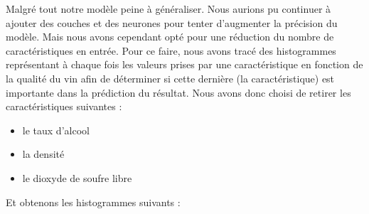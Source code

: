 \vspace{1cm}

Malgré tout notre modèle peine à généraliser. Nous aurions pu continuer à ajouter des couches et des neurones
pour tenter d'augmenter la précision du modèle. Mais nous avons cependant opté pour une réduction du nombre de
caractéristiques en entrée. Pour ce faire, nous avons tracé des histogrammes représentant à chaque fois
les valeurs prises par une caractéristique en fonction de la qualité du vin afin de déterminer si cette dernière (la caractéristique) est importante
dans la prédiction du résultat. Nous avons donc choisi de retirer les caractéristiques suivantes :

\newpage

\begin{itemize}
    \item le taux d'alcool
    \item la densité
    \item le dioxyde de soufre libre
\end{itemize}

\vspace{1cm}

Et obtenons les histogrammes suivants :

\vspace{1cm}

